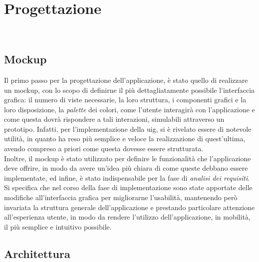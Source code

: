 \chapter{Progettazione}
\label{cap:progettazione}

\\

\section{Mockup}
\label{sec:mockup}

Il primo passo per la progettazione dell'applicazione, è stato quello di realizzare un \gls{mockup}\glsoccur, con lo scopo di definirne il più dettagliatamente possibile l'interfaccia grafica: il numero di viste necessarie, la loro struttura, i componenti grafici e la loro disposizione, la \emph{palette} dei colori, come l'utente interagirà con l'applicazione e come questa dovrà rispondere a tali interazioni, simulabili attraverso un prototipo. Infatti, per l'implementazione della \gls{uig}\glsoccur, si è rivelato essere di notevole utilità, in quanto ha reso più semplice e veloce la realizzazione di quest'ultima, avendo compreso a priori come questa dovesse essere strutturata.\\
Inoltre, il \gls{mockup} è stato utilizzato per definire le funzionalità che l'applicazione deve offrire, in modo da avere un'idea più chiara di come queste debbano essere implementate, ed infine, è stato indispensabile per la fase di \emph{analisi dei requisiti}.\\ 
Si specifica che nel corso della fase di implementazione sono state apportate delle modifiche all'interfaccia grafica per migliorarne l'usabilità, mantenendo però invariata la struttura generale dell'applicazione e prestando particolare attenzione all'esperienza utente, in modo da rendere l'utilizzo dell'applicazione, in mobilità, il più semplice e intuitivo possibile.

\section{Architettura}
\label{sec:architettura}

